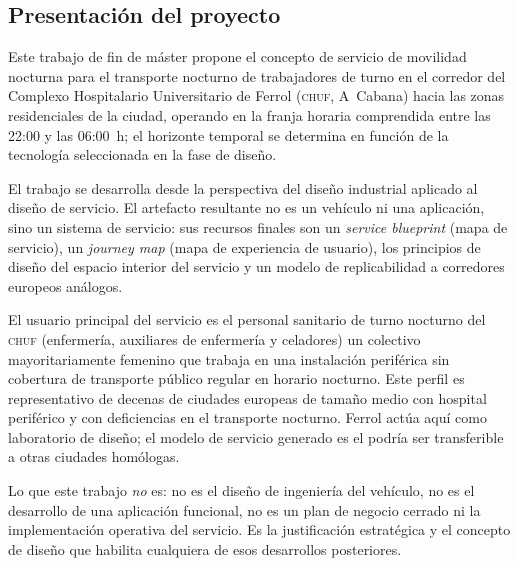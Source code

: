 


\subsection{Presentación del proyecto}
\label{sec:presentacion}

Este trabajo de fin de máster propone el concepto de servicio de movilidad nocturna 
para el transporte nocturno de trabajadores de turno en el corredor del Complexo 
Hospitalario Universitario de Ferrol (\textsc{chuf}, A~Cabana) hacia las zonas 
residenciales de la ciudad, operando en la franja horaria comprendida entre las 22:00
 y las 06:00~h; el horizonte temporal se determina en función de la tecnología seleccionada 
 en la fase de diseño.

El trabajo se desarrolla desde la perspectiva del diseño industrial aplicado
al diseño de servicio. El artefacto resultante no es un vehículo ni una
aplicación, sino un sistema de servicio: sus recursos finales son un
\textit{service blueprint} (mapa de servicio), un \textit{journey map}
(mapa de experiencia de usuario), los principios de diseño del espacio
interior del servicio y un modelo de replicabilidad a corredores europeos
análogos.

El usuario principal del servicio es el personal sanitario de turno nocturno
del \textsc{chuf} (enfermería, auxiliares de enfermería y celadores) un
colectivo mayoritariamente femenino que trabaja en una instalación periférica
sin cobertura de transporte público regular en horario nocturno. Este perfil
 es representativo de decenas de ciudades europeas de
tamaño medio con hospital periférico y con deficiencias en el transporte nocturno.
Ferrol actúa aquí como laboratorio de diseño; el modelo de servicio generado
es el podría ser transferible a otras ciudades homólogas.

Lo que este trabajo \emph{no} es: no es el diseño de ingeniería del
vehículo, no es el desarrollo de una aplicación funcional, no es un plan
de negocio cerrado ni la implementación operativa del servicio. Es la
justificación estratégica y el concepto de diseño que habilita cualquiera
de esos desarrollos posteriores.



